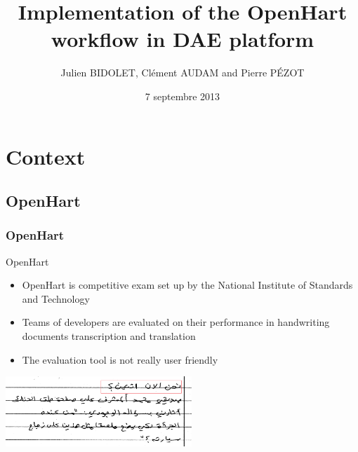 \documentclass[c]{beamer}
\title[Intermediary defense of Industrial Project]{Implementation of the OpenHart workflow in DAE platform}
\author{Julien BIDOLET, Clément AUDAM and Pierre P\'EZOT }
\date{7 septembre 2013}
\institute{TELECOM Nancy}
\begin{document}
\begin{frame}
  \maketitle
\end{frame}

\begin{frame}
  \tableofcontents
\end{frame}



\section{Context}
\subsection{OpenHart}
\begin{frame}
	\frametitle{OpenHart}
	\begin{block}{OpenHart}
	\begin{itemize}
		\item OpenHart is competitive exam set up by the National Institute of Standards and Technology
		\item Teams of developers are evaluated on their performance in handwriting documents transcription and translation
		\item The evaluation tool is not really user friendly
	\end{itemize}
	\end{block}
	\includegraphics[width=7.0cm]{trans.png}
\end{frame}
\end{document}
